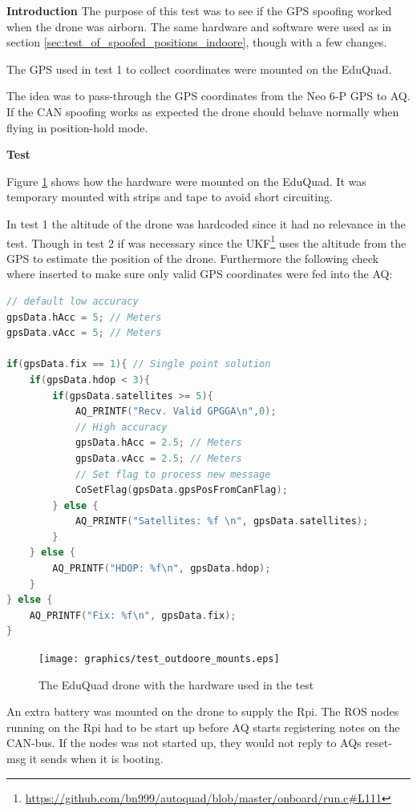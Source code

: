 \textbf{Introduction}
The purpose of this test was to see if the GPS spoofing worked when the drone was airborn. The same hardware and software were used as in section \ref{sec:test_of_spoofed_positions_indoore}, though with a few changes.

The GPS used in test 1 to collect coordinates were mounted on the EduQuad.

The idea was to pass-through the GPS coordinates from the Neo 6-P GPS to AQ. If the CAN spoofing works as expected the drone should behave normally when flying in position-hold mode.

\textbf{Test}

Figure \ref{fig:eduquad_bottom_up} shows how the hardware were mounted on the EduQuad. It was temporary mounted with strips and tape to avoid short circuiting.  

In test 1 the altitude of the drone was hardcoded since it had no relevance  in the test. Though in test 2 if was necessary since the UKF\footnote{\url{https://github.com/bn999/autoquad/blob/master/onboard/run.c\#L111}} uses the altitude from the GPS to estimate the position of the drone. Furthermore the following check where inserted to make sure only valid GPS coordinates were fed into the AQ:
\begin{center}

\begin{minipage}{\textwidth}
		\begin{lstlisting}[language = c++, caption = Quality checks added to discard bad positions, label=code:pseudo_tx]
// default low accuracy
gpsData.hAcc = 5; // Meters
gpsData.vAcc = 5; // Meters

if(gpsData.fix == 1){ // Single point solution
	if(gpsData.hdop < 3){
		if(gpsData.satellites >= 5){
			AQ_PRINTF("Recv. Valid GPGGA\n",0);
			// High accuracy
			gpsData.hAcc = 2.5; // Meters
			gpsData.vAcc = 2.5; // Meters
			// Set flag to process new message
			CoSetFlag(gpsData.gpsPosFromCanFlag);
        } else {
			AQ_PRINTF("Satellites: %f \n", gpsData.satellites);       
        }
    } else {
	    AQ_PRINTF("HDOP: %f\n", gpsData.hdop);    	
    }
} else {
	AQ_PRINTF("Fix: %f\n", gpsData.fix);
}
		\end{lstlisting}
\end{minipage}
\end{center}

\begin{figure}[H]
    \center
    \texttt{[image: graphics/test\_outdoore\_mounts.eps]}
  \caption{The EduQuad drone with the hardware used in the test}
    \label{fig:eduquad_bottom_up}
\end{figure}
An extra battery was mounted on the drone to supply the Rpi. The ROS nodes running on the Rpi had to be start up before AQ starts registering notes on the CAN-bus. If the nodes was not started up, they would not reply to AQs reset-msg it sends when it is booting. \\

